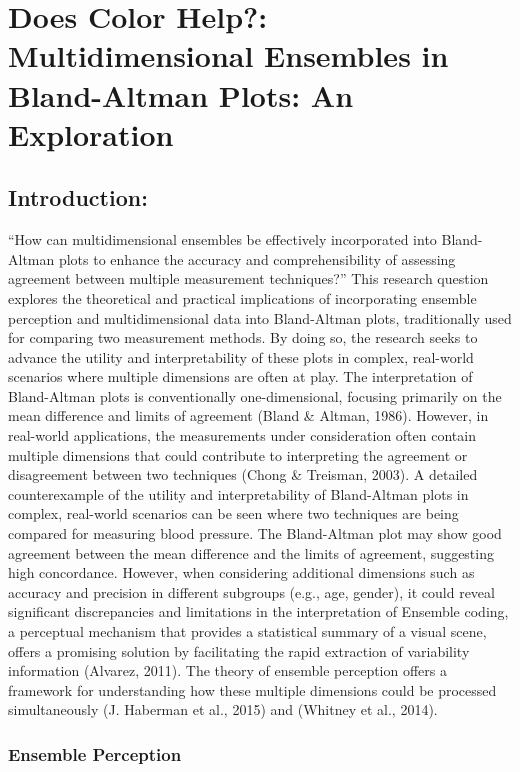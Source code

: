 \documentclass[print]{nuthesis}
\begin{document}
\hypertarget{ref-labels}{%
\chapter{Does Color Help?: Multidimensional Ensembles in Bland-Altman Plots: An Exploration}\label{ref-labels}}

\hypertarget{introduction-3}{%
\section{Introduction:}\label{introduction-3}}

``How can multidimensional ensembles be effectively incorporated into Bland-Altman plots to enhance the accuracy and comprehensibility of assessing agreement between multiple measurement techniques?''
This research question explores the theoretical and practical implications of incorporating ensemble perception and multidimensional data into Bland-Altman plots, traditionally used for comparing two measurement methods.
By doing so, the research seeks to advance the utility and interpretability of these plots in complex, real-world scenarios where multiple dimensions are often at play.
The interpretation of Bland-Altman plots is conventionally one-dimensional, focusing primarily on the mean difference and limits of agreement (Bland \& Altman, 1986).
However, in real-world applications, the measurements under consideration often contain multiple dimensions that could contribute to interpreting the agreement or disagreement between two techniques (Chong \& Treisman, 2003).
A detailed counterexample of the utility and interpretability of Bland-Altman plots in complex, real-world scenarios can be seen where two techniques are being compared for measuring blood pressure.
The Bland-Altman plot may show good agreement between the mean difference and the limits of agreement, suggesting high concordance.
However, when considering additional dimensions such as accuracy and precision in different subgroups (e.g., age, gender), it could reveal significant discrepancies and limitations in the interpretation of Ensemble coding, a perceptual mechanism that provides a statistical summary of a visual scene, offers a promising solution by facilitating the rapid extraction of variability information (Alvarez, 2011).
The theory of ensemble perception offers a framework for understanding how these multiple dimensions could be processed simultaneously (J. Haberman et al., 2015) and (Whitney et al., 2014).

\hypertarget{ensemble-perception-1}{%
\subsection{Ensemble Perception}\label{ensemble-perception-1}}
\end{document}

